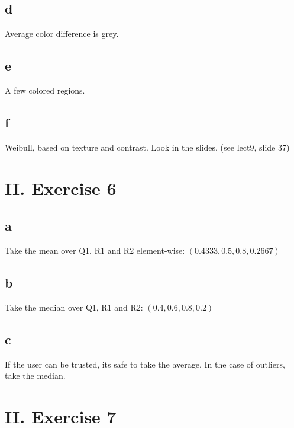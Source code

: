 \documentclass[a4paper,11pt]{article}
\begin{document}
	\subsection*{d}
	Average color difference is grey.
	\subsection*{e}
	A few colored regions.
	\subsection*{f}
	Weibull, based on texture and contrast. Look in the slides. (see lect9, slide 37)
	
	
	\section*{II. Exercise 6}
	\subsection*{a}
		Take the mean over Q1, R1 and R2 element-wise: $(0.4333, 0.5, 0.8, 0.2667)$
	\subsection*{b}
		Take the median over Q1, R1 and R2: $(0.4, 0.6, 0.8, 0.2)$
	\subsection*{c}
		If the user can be trusted, its safe to take the average. In the case of outliers, take the median.
		
	\section*{II. Exercise 7}	
	
	
\end{document}
